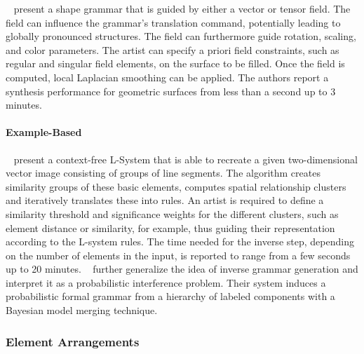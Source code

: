  \citeauthor*{yuanyuan_2011_gso}~\cite{yuanyuan_2011_gso} present a shape grammar that is guided by either a vector or tensor field. The field can influence the grammar's translation command, potentially leading to globally pronounced structures. The field can furthermore guide rotation, scaling, and color parameters. The artist can specify a priori field constraints, such as regular and singular field elements, on the surface to be filled. Once the field is computed, local Laplacian smoothing can be applied. The authors report a synthesis performance for geometric surfaces from less than a second up to 3 minutes. 


\paragraph*{Example-Based}
\label{para:analysis_rulebased_example}

\citeauthor*{stava_2010_ipm}~\cite{stava_2010_ipm} present a context-free L-System that is able to recreate a given two-dimensional vector image consisting of groups of line segments. The algorithm creates similarity groups of these basic elements, computes spatial relationship clusters and iteratively translates these into rules. An artist is required to define a similarity threshold and significance weights for the different clusters, such as element distance or similarity, for example, thus guiding their representation according to the L-system rules. The time needed for the inverse step, depending on the number of elements in the input, is reported to range from a few seconds up to 20 minutes. \citeauthor*{talton_2012_ldp}~\cite{talton_2012_ldp} further generalize the idea of inverse grammar generation and interpret it as a probabilistic interference problem. Their system induces a probabilistic formal grammar from a hierarchy of labeled components with a Bayesian model merging technique.


\subsubsection{Element Arrangements}
\label{subsubsec:analysis_element_arrangements}

